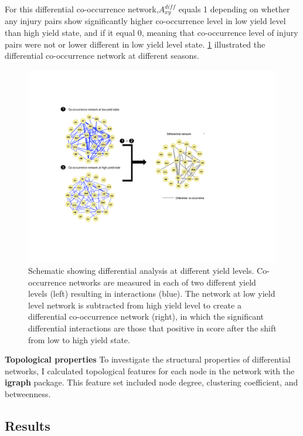 For  this differential co-occurrence network,$A_{xy}^{diff}$ equals 1 depending on whether any injury pairs show significantly higher co-occurrence level in low yield level than high yield state, and if it equal 0, meaning that co-occurrence level of injury pairs were not or lower different in low yield level state. \ref{fig:pipeline4} illustrated the differential co-occurrence network at different seasons.

\begin{figure}[h]
\centering
\includegraphics[width = 1\textwidth]{figures/pipeline4.pdf}
\caption[Differential analysis of crop health survey data at different yield levels]{Schematic showing differential analysis at different yield levels. Co-occurrence networks are measured in each of two different yield levels (left) resulting in interactions (blue). The network at low yield level network is subtracted from high yield level to create a differential co-occurrence network (right), in which the significant differential interactions are those that positive in score after the shift from low to high yield state.}
\label{fig:pipeline4}
\end{figure} 

\textbf{Topological properties}
To investigate the structural properties of differential networks, I calculated topological features for each node in the network with the \textbf{igraph} package. This feature set included node degree, clustering coefficient, and betweenness. 


\clearpage
\subsection{Results}

